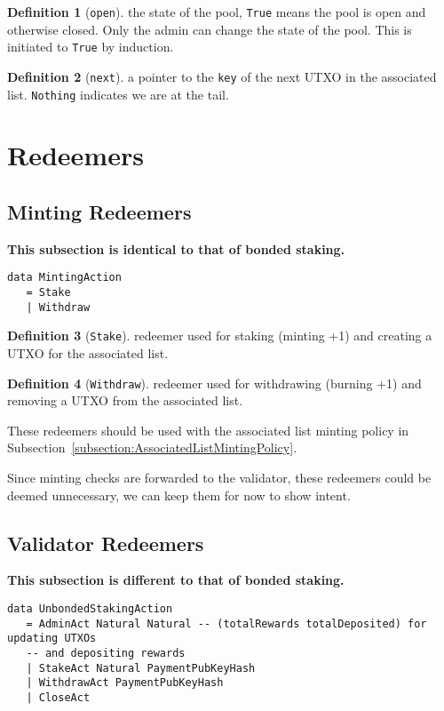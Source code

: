 \documentclass[10pt, a4paper]{article}
\theoremstyle{definition}
\newtheorem{definition}{Definition}[section]
\begin{document}
\begin{definition}[\texttt{open}]\label{def:open}
the state of the pool, \texttt{True} means the pool is open and otherwise closed. Only the admin can change the state of the pool. This is initiated to \texttt{True} by induction.
\end{definition}

\begin{definition}[\texttt{next}]\label{def:next}
a pointer to the \texttt{key} of the next UTXO in the associated list. \texttt{Nothing} indicates we are at the tail.
\end{definition}

\section{Redeemers}
\subsection{Minting Redeemers}
\textbf{This subsection is identical to that of bonded staking.}

\begin{verbatim}
data MintingAction
   = Stake
   | Withdraw
\end{verbatim}
\begin{definition}[\texttt{Stake}]\label{def:Stake} redeemer used for staking (minting +1) and creating a UTXO for the associated list.
\end{definition}

\begin{definition}[\texttt{Withdraw}]\label{def:Withdraw} redeemer used for withdrawing (burning +1) and removing a UTXO from the associated list.
\end{definition}

These redeemers should be used with the associated list minting policy in Subsection~\ref{subsection:AssociatedListMintingPolicy}.

Since minting checks are forwarded to the validator, these redeemers could be deemed unnecessary, we can keep them for now to show intent.

\subsection{Validator Redeemers}
\textbf{This subsection is different to that of bonded staking.}

\begin{verbatim}
data UnbondedStakingAction
   = AdminAct Natural Natural -- (totalRewards totalDeposited) for updating UTXOs 
   -- and depositing rewards
   | StakeAct Natural PaymentPubKeyHash
   | WithdrawAct PaymentPubKeyHash
   | CloseAct
\end{verbatim}
\end{document}

